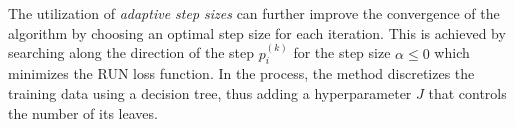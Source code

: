  \label{sec:dsea:dsea:stepsize:adaptive}
The utilization of \emph{adaptive step sizes} \cite{dsea_mirko}
can further improve the convergence of the algorithm
  by choosing an optimal step size for each iteration.
This is achieved by searching
  along the direction of the step $p_i^{(k)}$ %
  for the step size $\alpha \leq 0$
    which minimizes the \ac{RUN} \cite{milke2013} loss function.
In the process,
the method discretizes the training data
  using a decision tree,
  thus adding a hyperparameter $J$
    that controls the number of its leaves.
